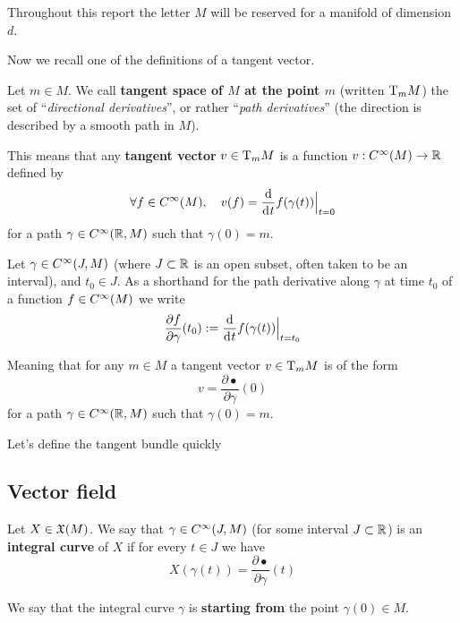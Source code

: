     Throughout this report the letter $M$ will be reserved for a manifold of dimension $d$.

	Now we recall one of the definitions of a tangent vector.

	\begin{definition}
		Let $m \in M$.
		We call \textbf{tangent space of $M$ at the point $m$} (written $\mathrm{T}_m{M}$) the set of ``\emph{directional derivatives}'', or rather ``\emph{path derivatives}'' (the direction is described by a smooth path in $M$).
        
		This means that any \textbf{tangent vector} $v \in \mathrm{T}_m{M}$ is a function $v: C^\infty(M) \to \mathbb{R}$ defined by
		$$
			\forall f \in \Cinf(M), \quad v(f) = \frac{\d}{\di{t}} f(\gamma(t)) \Big|_{t=0}
		$$
		for a path $\gamma \in C^\infty(\mathbb{R}, M)$ such that $\gamma(0) = m$.
	\end{definition}

	\begin{notation}
		Let $\gamma \in C^\infty(J, M)$ (where $J \subset \mathbb{R}$ is an open subset, often taken to be an interval), and $t_0 \in J$.
		As a shorthand for the path derivative along $\gamma$ at time $t_0$ of a function $f \in C^\infty(M)$ we write 
		$$
			\frac{\partial f}{\partial \gamma}(t_0) := \frac{\d}{\di{t}} f(\gamma(t)) \Big|_{t=t_0}
		$$

		Meaning that for any $m \in M$ a tangent vector $v \in \mathrm{T}_m{M}$ is of the form
		$$
			v = \frac{\partial \bullet}{\partial \gamma}(0)
		$$
		for a path $\gamma \in C^\infty(\mathbb{R}, M)$ such that $\gamma(0) = m$.
	\end{notation}


	Let's define the tangent bundle quickly

    

	\subsection{Vector field}

	\begin{definition}
		Let $X \in \mathfrak{X}(M)$.
		We say that $\gamma \in C^\infty(J,M)$ (for some interval $J \subset \mathbb{R}$) is an \textbf{integral curve} of $X$ if for every $t \in J$ we have
		$$
			X(\gamma(t)) = \frac{\partial \bullet}{\partial \gamma}(t)
		$$
		




		We say that the integral curve $\gamma$ is \textbf{starting from} the point $\gamma(0) \in M$.
	\end{definition}

